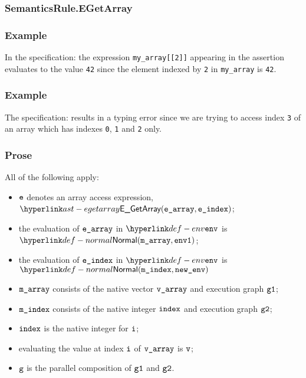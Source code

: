 \subsubsection{SemanticsRule.EGetArray\label{sec:SemanticsRule.EGetArray}}
\subsubsection{Example}
In the specification:
the expression \texttt{my\_array[[2]]} appearing in the assertion evaluates to the value \texttt{42} since the element
indexed by \texttt{2} in \texttt{my\_array} is \texttt{42}.

\subsubsection{Example}
The specification:
results in a typing error since we are trying to access index \texttt{3} of an array
which has indexes \texttt{0}, \texttt{1} and \texttt{2} only.

\subsubsection{Prose}
All of the following apply:
\begin{itemize}
  \item $\texttt{e}$ denotes an array access expression, $\EGetArray(\earray, \eindex)$;
  \item the evaluation of $\texttt{e\_array}$ in $\env$ is $\Normal(\marray, \envone)$\ProseOrAbnormal;
  \item the evaluation of $\texttt{e\_index}$ in $\env$ is  $\Normal(\mindex, \newenv)$\ProseOrAbnormal
  \item $\texttt{m\_array}$ consists of the native vector $\texttt{v\_array}$ and execution graph $\texttt{g1}$;
  \item $\texttt{m\_index}$ consists of the native integer $\texttt{index}$ and execution graph $\texttt{g2}$;
  \item $\texttt{index}$ is the native integer for $\texttt{i}$;
  \item evaluating the value at index $\texttt{i}$ of $\texttt{v\_array}$ is $\texttt{v}$;
  \item $\texttt{g}$ is the parallel composition of $\texttt{g1}$ and $\texttt{g2}$.
\end{itemize}

